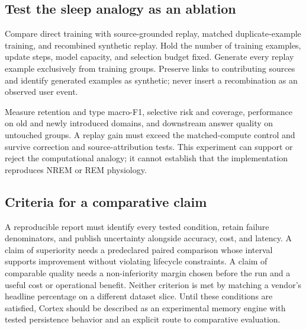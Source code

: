 \subsection{Test the sleep analogy as an ablation}
Compare direct training with source-grounded replay, matched duplicate-example training, and recombined synthetic replay. Hold the number of training examples, update steps, model capacity, and selection budget fixed. Generate every replay example exclusively from training groups. Preserve links to contributing sources and identify generated examples as synthetic; never insert a recombination as an observed user event.

Measure retention and type macro-F1, selective risk and coverage, performance on old and newly introduced domains, and downstream answer quality on untouched groups. A replay gain must exceed the matched-compute control and survive correction and source-attribution tests. This experiment can support or reject the computational analogy; it cannot establish that the implementation reproduces NREM or REM physiology.

\subsection{Criteria for a comparative claim}
A reproducible report must identify every tested condition, retain failure denominators, and publish uncertainty alongside accuracy, cost, and latency. A claim of superiority needs a predeclared paired comparison whose interval supports improvement without violating lifecycle constraints. A claim of comparable quality needs a non-inferiority margin chosen before the run and a useful cost or operational benefit. Neither criterion is met by matching a vendor's headline percentage on a different dataset slice. Until these conditions are satisfied, Cortex should be described as an experimental memory engine with tested persistence behavior and an explicit route to comparative evaluation.
